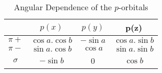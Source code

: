 \begin{table}

\begin{tabular}{|c|ccc|} \hline
 &
$p(x)$ &
$p(y)$ &
p(z)
 \\ \hline
%
$\pi +$ &
$\cos a.\cos b$ &
$-\sin a$ &
$\cos a.\sin b$ \\
%
$\pi -$ &
$\sin a.\cos b$ &
$\cos a$ &
$\sin a.\sin b$ \\
%
$\sigma$ &
$-\sin b$ &
0 &
$\cos b$ \\ \hline
\end{tabular}
\caption{\label{p-rot} Angular Dependence of the $p$-orbitals}
\end{table}
